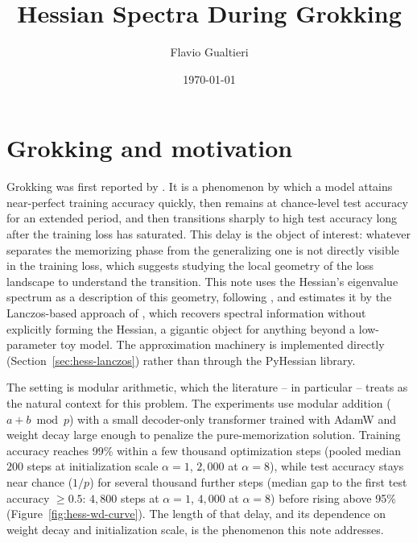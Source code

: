 \documentclass[11pt,a4paper]{article}
\title{Hessian Spectra During Grokking}
\author{Flavio Gualtieri}
\date{\today}
\begin{document}
\maketitle

\section{Grokking and motivation}
\label{sec:hess-intro}

Grokking was first reported by \citet{power2022grokking}. It is a phenomenon by which a model attains near-perfect training
accuracy quickly, then remains at chance-level test accuracy for an extended period,
and then transitions sharply to high test accuracy long after the training loss has saturated.  This delay is the object of interest: whatever separates the memorizing phase from the generalizing one is not directly visible in the training loss, which suggests studying the local geometry of the loss landscape to understand the transition. This note uses the Hessian's eigenvalue spectrum as
a description of this geometry, following \citet{fort2018goldilocks}, and
estimates it by the Lanczos-based approach of \citet{yao2020pyhessian}, which
recovers spectral information without explicitly forming the Hessian, a gigantic object for anything beyond a low-parameter toy model. The approximation machinery is implemented directly (Section~\ref{sec:hess-lanczos}) rather than through the PyHessian library.

The setting is modular arithmetic, which the literature -- \citet{gromov2023grokking} in particular -- treats as the natural context for this problem.
The experiments use modular addition ($a + b \bmod p$) with a small
decoder-only transformer trained with AdamW and weight decay large enough to
penalize the pure-memorization solution. Training accuracy reaches 99\% within a few thousand optimization steps
(pooled median $200$ steps at initialization scale $\alpha=1$, $2{,}000$ at $\alpha=8$),
while test accuracy stays near chance ($1/p$) for several thousand further steps
(median gap to the first test accuracy $\ge 0.5$: $4{,}800$ steps at $\alpha=1$, $4{,}000$ at $\alpha=8$)
before rising above 95\% (Figure~\ref{fig:hess-wd-curve}). The length of that delay, and its
dependence on weight decay and initialization scale, is the phenomenon this note addresses.
\end{document}
